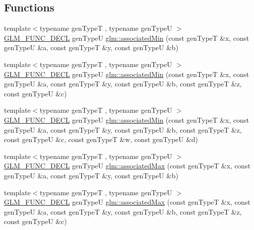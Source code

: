 \subsection*{Functions}
\begin{DoxyCompactItemize}
\item 
{\footnotesize template$<$typename gen\+TypeT , typename gen\+TypeU $>$ }\\\hyperlink{setup_8hpp_ab2d052de21a70539923e9bcbf6e83a51}{G\+L\+M\+\_\+\+F\+U\+N\+C\+\_\+\+D\+E\+CL} gen\+TypeU \hyperlink{group__gtx__associated__min__max_ga47bdb60409768f3d315bc5a1f739810a}{glm\+::associated\+Min} (const gen\+TypeT \&x, const gen\+TypeU \&a, const gen\+TypeT \&y, const gen\+TypeU \&b)
\item 
{\footnotesize template$<$typename gen\+TypeT , typename gen\+TypeU $>$ }\\\hyperlink{setup_8hpp_ab2d052de21a70539923e9bcbf6e83a51}{G\+L\+M\+\_\+\+F\+U\+N\+C\+\_\+\+D\+E\+CL} gen\+TypeU \hyperlink{group__gtx__associated__min__max_ga3f696c0cce55211f333edb7336cc9cb8}{glm\+::associated\+Min} (const gen\+TypeT \&x, const gen\+TypeU \&a, const gen\+TypeT \&y, const gen\+TypeU \&b, const gen\+TypeT \&z, const gen\+TypeU \&c)
\item 
{\footnotesize template$<$typename gen\+TypeT , typename gen\+TypeU $>$ }\\\hyperlink{setup_8hpp_ab2d052de21a70539923e9bcbf6e83a51}{G\+L\+M\+\_\+\+F\+U\+N\+C\+\_\+\+D\+E\+CL} gen\+TypeU \hyperlink{group__gtx__associated__min__max_ga45618e13844d00046a0fe3409ae7513e}{glm\+::associated\+Min} (const gen\+TypeT \&x, const gen\+TypeU \&a, const gen\+TypeT \&y, const gen\+TypeU \&b, const gen\+TypeT \&z, const gen\+TypeU \&c, const gen\+TypeT \&w, const gen\+TypeU \&d)
\item 
{\footnotesize template$<$typename gen\+TypeT , typename gen\+TypeU $>$ }\\\hyperlink{setup_8hpp_ab2d052de21a70539923e9bcbf6e83a51}{G\+L\+M\+\_\+\+F\+U\+N\+C\+\_\+\+D\+E\+CL} gen\+TypeU \hyperlink{group__gtx__associated__min__max_gaee554495240b93d80492b3d2312ede1d}{glm\+::associated\+Max} (const gen\+TypeT \&x, const gen\+TypeU \&a, const gen\+TypeT \&y, const gen\+TypeU \&b)
\item 
{\footnotesize template$<$typename gen\+TypeT , typename gen\+TypeU $>$ }\\\hyperlink{setup_8hpp_ab2d052de21a70539923e9bcbf6e83a51}{G\+L\+M\+\_\+\+F\+U\+N\+C\+\_\+\+D\+E\+CL} gen\+TypeU \hyperlink{group__gtx__associated__min__max_ga20218dcc769c76adf0c3e9aad21c64a4}{glm\+::associated\+Max} (const gen\+TypeT \&x, const gen\+TypeU \&a, const gen\+TypeT \&y, const gen\+TypeU \&b, const gen\+TypeT \&z, const gen\+TypeU \&c)

\end{DoxyCompactItemize}
